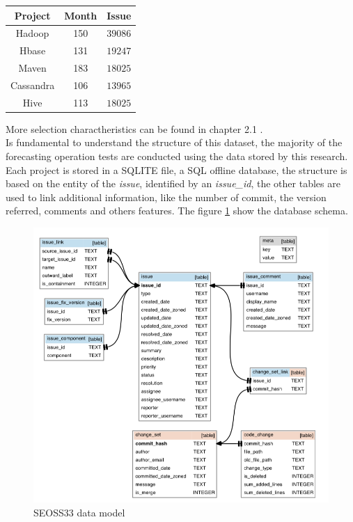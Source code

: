 \documentclass[%
    corpo=12pt,
    twoside,
    oldstyle,
    autoretitolo,
    greek,
    evenboxes,
]{toptesi}
\begin{document}
\begin{center}
   \label{tab:seoss33_selected}
  \begin{tabular}{ |c|c|c| }
     \hline
     \textbf{Project} & \textbf{Month} & \textbf{Issue} \\
     \hline
     \hline
     Hadoop & 150 & $39086$ \\
     Hbase & 131 & $19247$ \\
     Maven & 183 & $18025$ \\
     Cassandra & 106 & $13965$ \\
     Hive & 113 & $18025$ \\
     \hline
  \end{tabular}
\end{center}

More selection charactheristics can be found in chapter 2.1 \cite{SEOSS33}.\\

Is fundamental to understand the structure of this dataset, the majority of the forecasting operation tests are conducted using the data stored by this research.\\
Each project is stored in a SQLITE file, a SQL offline database, the structure is based on the entity of the \textit{issue}, identified by an \textit{issue\_id}, the other tables are used to link additional information, like the number of commit, the version referred, comments and others features. The figure \ref{fig:seoss33_db} show the database schema.

\begin{figure}[!h]
  \includegraphics[width=\linewidth]{figure/seoss33_db_schema.png}
  \caption{SEOSS33 data model}
  \label{fig:seoss33_db}
\end{figure}
\end{document}
